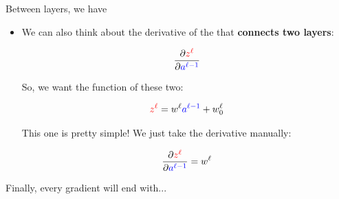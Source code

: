     Between layers, we have
        
        \begin{itemize}
            
            \item We can also think about the derivative of the  that \textbf{connects two layers}:
            
                \begin{equation}
                    \frac{\partial \textcolor{red}{z^\ell}}{\partial \textcolor{blue}{a^{\ell-1}}}
                \end{equation}
                
                So, we want the function of these two:
                
                \begin{equation}
                    \textcolor{red}{z^\ell} = w^\ell \textcolor{blue}{ a^{\ell-1} } + w_0^\ell
                \end{equation}
                
                This one is pretty simple! We just take the derivative manually:
                
                \begin{equation}
                    \frac{\partial \textcolor{red}{z^\ell}}{\partial \textcolor{blue}{a^{\ell-1}}}
                    =
                    w^{\ell}
                \end{equation}
                
        \end{itemize}
        
    Finally, every gradient will end with...
        
